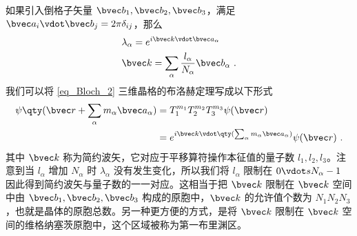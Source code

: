 如果引入倒格子矢量 $\bvec b_1,\bvec b_2,\bvec b_3$，满足 $\bvec a_i \vdot  \bvec b_j = 2\pi \delta_{ij}$，那么
\begin{equation}
\begin{aligned}
&\lambda_\alpha = e^{i \bvec k \vdot  \bvec a_\alpha}\\
&\bvec k=\sum_\alpha\frac{l_\alpha}{N_\alpha} \bvec b_\alpha~.
\end{aligned}
\end{equation}
我们可以将 \autoref{eq_Bloch_2} 三维晶格的布洛赫定理写成以下形式
\begin{equation}
\begin{aligned}
\psi\qty(\bvec r+\sum_\alpha m_\alpha\bvec a_\alpha) &= T_1^{m_1} T_2^{m_2} T_3^{m_3} \psi(\bvec r)\\
&=e^{i\bvec k\vdot  \qty(\sum_\alpha m_\alpha\bvec a_\alpha)}\psi(\bvec r)~.
\end{aligned}
\end{equation}
其中 $\bvec k$ 称为简约波矢，它对应于平移算符操作本征值的量子数 $l_1,l_2,l_3$。注意到当 $l_\alpha$ 增加 $N_\alpha$ 时 $\lambda_\alpha$ 没有发生变化，所以我们将 $l_\alpha$ 限制在 $0\vdot s N_\alpha-1$ 因此得到简约波矢与量子数的一一对应。这相当于把 $\bvec k$ 限制在 $\bvec k$ 空间中由 $\bvec b_1,\bvec b_2,\bvec b_3$ 构成的原胞中，$\bvec k$ 的允许值个数为 $N_1N_2N_3$，也就是晶体的原胞总数。另一种更方便的方式，是将 $\bvec k$ 限制在 $\bvec k$ 空间的维格纳塞茨原胞中，这个区域被称为第一布里渊区。